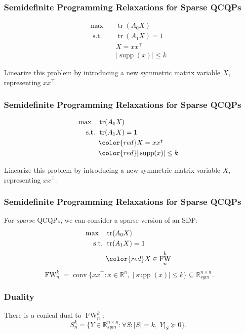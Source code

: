 \documentclass{beamer}
\newcommand{\R}{\mathbb{R}}
\DeclareMathOperator*{\supp}{supp}
\DeclareMathOperator{\conv}{\operatorname{conv}}
\DeclareMathOperator{\FW}{FW}
\DeclareMathOperator{\tr}{tr}
\newcommand{\st}{{\text{ s.t. }}}
\newcommand{\Sym}{\R^{n\times n}_{sym}}
\begin{document}
\begin{frame}
\frametitle{Semidefinite Programming Relaxations for Sparse QCQPs}
    \begin{equation*}
        \begin{aligned}
            \max\quad & \tr(A_0X)\\
            \st & \tr(A_1X) = 1\\
                & X = xx^{\intercal}\\
                &|\supp(x)| \le k
        \end{aligned}
    \end{equation*}

    Linearize this problem by introducing a new symmetric matrix variable $X$, representing $xx^{\intercal}$.
\end{frame}
\begin{frame}
\frametitle{Semidefinite Programming Relaxations for Sparse QCQPs}

    \begin{equation*}
        \begin{aligned}
            \max\quad & \tr(A_0X)\\
            \st & \tr(A_1X) = 1\\
                & {\color{red}X = xx^{\intercal}}\\
                & {\color{red} |\supp(x)| \le k}
        \end{aligned}
    \end{equation*}

    Linearize this problem by introducing a new symmetric matrix variable $X$, representing $xx^{\intercal}$.
\end{frame}
\begin{frame}
\frametitle{Semidefinite Programming Relaxations for Sparse QCQPs}
    For \emph{sparse} QCQPs, we can consider a sparse version of an SDP:
    \begin{equation*}
        \begin{aligned}
            \max\quad & \tr(A_0X)\\
            \st & \tr(A_1X) = 1\\
                & {\color{red}X \in \FW^k_n}\\
        \end{aligned}
    \end{equation*}
    \pause 
    \[
        \FW^k_n = \conv \{xx^{\intercal} : x\in \R^n,\;|\supp(x)| \le k\} \subseteq \Sym. 
    \]
\end{frame}
\begin{frame}
    \frametitle{Duality}
    There is a conical dual to $\FW^k_n$:
    \[
        S^k_n = \{Y \in \Sym : \forall S : |S| = k, \;Y|_S \succeq 0\}.
    \]
\end{frame}
\end{document}
